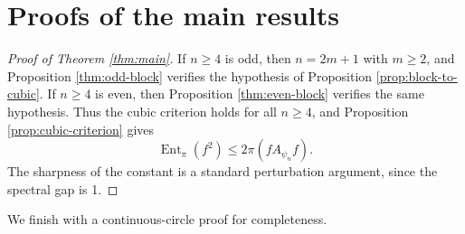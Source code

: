 \documentclass[11pt]{amsart}
\numberwithin{equation}{section}
\theoremstyle{plain}
\theoremstyle{remark}
\newcommand{\psin}{\psi_n}
\newcommand{\Apsi}{A_{\psin}}
\newcommand{\AvgSymbol}{\pi}
\newcommand{\Avg}[1]{\AvgSymbol\!\left(#1\right)}
\newcommand{\EntMeasure}{\pi}
\newcommand{\Ent}[1]{\operatorname{Ent}_{\EntMeasure}\!\left(#1\right)}
\newcommand{\abs}[1]{\left|#1\right|}
\begin{document}
\section{Proofs of the main results}\label{sec:proofs}

\begin{proof}[Proof of Theorem \ref{thm:main}]
If \(n\ge4\) is odd, then \(n=2m+1\) with \(m\ge2\), and Proposition
\ref{thm:odd-block} verifies the hypothesis of Proposition
\ref{prop:block-to-cubic}.  If \(n\ge4\) is even, then Proposition
\ref{thm:even-block} verifies the same hypothesis.  Thus the cubic
criterion holds for all \(n\ge4\), and Proposition \ref{prop:cubic-criterion}
gives
\[
  \Ent{f^2}\le2\Avg{f\Apsi f}.
\]
The sharpness of the constant is a standard perturbation argument, since the spectral gap is 1. 
\end{proof}



We finish with a continuous-circle proof for completeness. 
\end{document}
